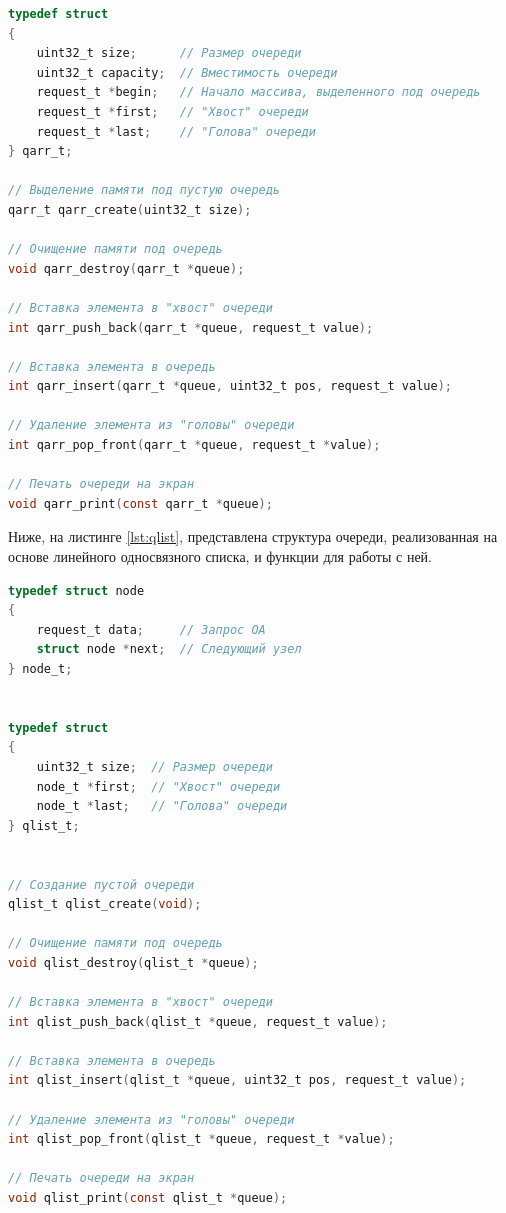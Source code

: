 \begin{lstlisting}[language=C,caption=Структура очереди на массиве,label=lst:qarr]
typedef struct
{
	uint32_t size;      // Размер очереди
	uint32_t capacity;  // Вместимость очереди
	request_t *begin;   // Начало массива, выделенного под очередь
	request_t *first;   // "Хвост" очереди
	request_t *last;    // "Голова" очереди
} qarr_t;

// Выделение памяти под пустую очередь
qarr_t qarr_create(uint32_t size);

// Очищение памяти под очередь
void qarr_destroy(qarr_t *queue);

// Вставка элемента в "хвост" очереди
int qarr_push_back(qarr_t *queue, request_t value);

// Вставка элемента в очередь
int qarr_insert(qarr_t *queue, uint32_t pos, request_t value);

// Удаление элемента из "головы" очереди
int qarr_pop_front(qarr_t *queue, request_t *value);

// Печать очереди на экран
void qarr_print(const qarr_t *queue);
\end{lstlisting}

Ниже, на листинге \ref{lst:qlist}, представлена структура очереди, реализованная на основе линейного односвязного списка, и функции для работы с ней.

\begin{lstlisting}[language=C,caption=Структура очереди на линейном списке,label=lst:qlist]
typedef struct node
{
	request_t data;     // Запрос ОА
	struct node *next;  // Следующий узел
} node_t;


typedef struct
{
	uint32_t size;  // Размер очереди
	node_t *first;  // "Хвост" очереди
	node_t *last;   // "Голова" очереди
} qlist_t;


// Создание пустой очереди
qlist_t qlist_create(void);

// Очищение памяти под очередь
void qlist_destroy(qlist_t *queue);

// Вставка элемента в "хвост" очереди
int qlist_push_back(qlist_t *queue, request_t value);

// Вставка элемента в очередь
int qlist_insert(qlist_t *queue, uint32_t pos, request_t value);

// Удаление элемента из "головы" очереди
int qlist_pop_front(qlist_t *queue, request_t *value);

// Печать очереди на экран
void qlist_print(const qlist_t *queue);
\end{lstlisting}

